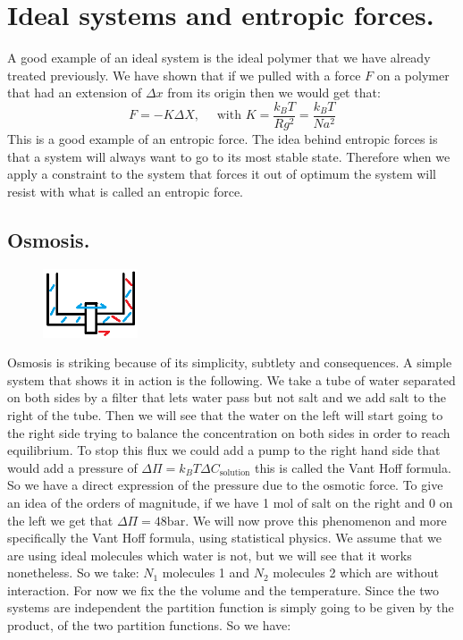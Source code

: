 \documentclass[10pt,a4paper]{book}
\begin{document}
\chapter{Ideal systems and entropic forces.}
A good example of an ideal system is the ideal polymer that we have already treated previously. We have shown that if we pulled with a force $F$ on a polymer that had an extension of $\Delta x$ from its origin then we would get that:
\[
F = - K \Delta X, \quad \text{ with } K = \frac{k_B T}{R g^2} = \frac{k_B T}{N a^2}
\]
This is a good example of an entropic force. The idea behind entropic forces is that a system will always want to go to its most stable state. Therefore when we apply a constraint to the system that forces it out of optimum the system will resist with what is called an entropic force.

\section{Osmosis.}
\begin{figure}
    \includegraphics[width=0.25\textwidth]{graphs/Osmosis}
\end{figure}
Osmosis is striking because of its simplicity, subtlety and consequences. A simple system that shows it in action is the following. We take a tube of water separated on both sides by a filter that lets water pass but not salt and we add salt to the right of the tube. Then we will see that the water on the left will start going to the right side trying to balance the concentration on both sides in order to reach equilibrium. To stop this flux we could add a pump to the right hand side that would add a pressure of $\Delta \Pi = k_B T \Delta C_{\text{solution}}$ this is called the Vant Hoff formula. So we have a direct expression of the pressure due to the osmotic force. To give an idea of the orders of magnitude, if we have 1 mol of salt on the right and 0 on the left we get that $\Delta \Pi = 48 \text{bar}$. We will now prove this phenomenon and more specifically the Vant Hoff formula, using statistical physics. We assume that we are using ideal molecules which water is not, but we will see that it works nonetheless. So we take: $N_1$ molecules 1 and $N_2$ molecules 2 which are without interaction. For now we fix the the volume and the temperature. Since the two systems are independent the partition function is simply going to be given by the product, of the two partition functions. So we have:
\end{document}
